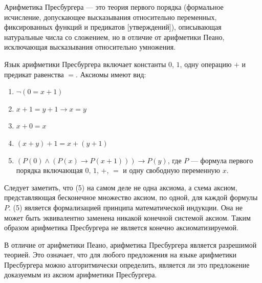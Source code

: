     



    
    \begin{Def}
        Арифметика Пресбургера — это теория первого порядка (формальное исчисление, допускающее высказывания относительно переменных, фиксированных функций и предикатов [утверждений]), описывающая натуральные числа со сложением, но в отличие от арифметики Пеано, исключающая высказывания относительно умножения.
    \end{Def}
    \begin{Def}
        Язык арифметики Пресбургера включает константы $0$, $1$, одну операцию $+$ и предикат равенства $=$. Аксиомы имеют вид:
        \begin{enumerate}
            \item $\neg (0 = x + 1)$
            \item $x + 1 = y + 1 \rightarrow x = y$
            \item $x + 0 = x$
            \item $(x + y) + 1 = x + (y + 1)$
            \item$ (P(0) \wedge (P(x) \rightarrow P(x + 1))) \rightarrow P(y)$, где $P$ ---  формула первого порядка включающая $0$, $1$, $+$, $=$ и одну свободную переменную $x$.
        \end{enumerate}
        Следует заметить, что (5) на самом деле не одна аксиома, а схема аксиом, представляющая бесконечное множество аксиом, по одной, для каждой формулы $P$. (5) является формализацией принципа математической индукции. Она не может быть эквивалентно заменена никакой конечной системой аксиом. Таким образом арифметика Пресбургера не является конечно аксиоматизируемой.
    \end{Def}
    \begin{Rem}
        В отличие от арифметики Пеано, арифметика Пресбургера является разрешимой теорией. Это означает, что для любого предложения на языке арифметики Пресбургера можно алгоритмически определить, является ли это предложение доказуемым из аксиом арифметики Пресбургера.
    \end{Rem}
